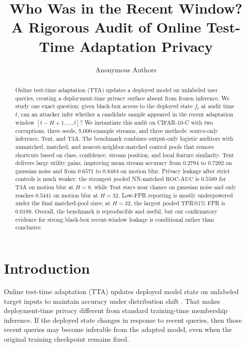 \title{Who Was in the Recent Window?\\A Rigorous Audit of Online Test-Time Adaptation Privacy}

\author{Anonymous Authors}

\newcommand{\recentlabel}{m_t^H}
\newcommand{\ft}{f_t}
\newcommand{\fsrc}{f_{\mathrm{src}}}
\newcommand{\auc}{\mathrm{ROC\mbox{-}AUC}}



\maketitle

\begin{abstract}
Online test-time adaptation (TTA) updates a deployed model on unlabeled user queries, creating a deployment-time privacy surface absent from frozen inference. We study one exact question: given black-box access to the deployed state $\ft$ at audit time $t$, can an attacker infer whether a candidate sample appeared in the recent adaptation window $[t-H+1,\ldots,t]$? We instantiate this audit on CIFAR-10-C with two corruptions, three seeds, 5{,}000-example streams, and three methods: source-only inference, Tent, and T3A. The benchmark combines output-only logistic auditors with unmatched, matched, and nearest-neighbor-matched control pools that remove shortcuts based on class, confidence, stream position, and local feature similarity. Tent delivers large utility gains, improving mean stream accuracy from $0.2794$ to $0.7292$ on gaussian noise and from $0.6571$ to $0.8484$ on motion blur. Privacy leakage after strict controls is much weaker: the strongest pooled NN-matched $\auc$ is $0.5589$ for T3A on motion blur at $H{=}8$, while Tent stays near chance on gaussian noise and only reaches $0.5441$ on motion blur at $H{=}32$. Low-FPR reporting is mostly underpowered under the final matched-pool sizes; at $H{=}32$, the largest pooled TPR@1\% FPR is $0.0188$. Overall, the benchmark is reproducible and useful, but our confirmatory evidence for strong black-box recent-window leakage is conditional rather than conclusive.
\end{abstract}

\section{Introduction}

Online test-time adaptation (TTA) updates deployed model state on unlabeled target inputs to maintain accuracy under distribution shift \citep{wang2021tent,wang2022cotta,niu2022eata}. That makes deployment-time privacy different from standard training-time membership inference. If the deployed state changes in response to recent queries, then those recent queries may become inferable from the adapted model, even when the original training checkpoint remains fixed.

